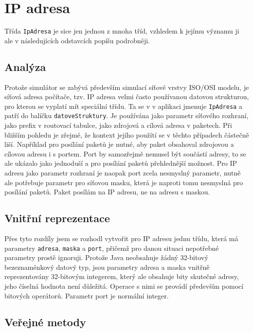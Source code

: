 
\section{IP adresa}

Třída \verb|IpAdresa| je sice jen jednou z mnoha tříd, vzhledem k jejímu významu ji ale v následujících odstavcích popíšu podrobněji.


\subsection{Analýza}

Protože simulátor se zabývá především simulací síťové vrstvy ISO/OSI modelu, je síťová adresa počítače, tzv. IP adresa velmi často používanou datovou strukturou, pro kterou se vyplatí mít speciální třídu. Ta se v v aplikaci jmenuje \verb|IpAdresa| a patří do balíčku \verb|datoveStruktury|. Je používána jako parametr síťového rozhraní, jako prefix v routovací tabulce, jako zdrojová a cílová adresa v paketech. Při bližším pohledu je zřejmé, že kontext jejího použítí se v těchto případech částečně liší. Například pro posílání paketů je nutné, aby paket obsahoval zdrojovou a cílovou adresu i s portem. Port by samozřejmě nemusel být součástí adresy, to se ale ukázalo jako jednoduší a pro posílání paketů přehlednější možnost. Pro IP adresu jako parametr rozhraní je naopak port zcela nesmyslný parametr, nutně ale potřebuje parametr pro síťovou masku, která je naproti tomu nesmyslná pro posílání paketů. Paket posílám na IP adresu, ne na adresu s maskou.


\subsection{Vnitřní reprezentace}

Přes tyto rozdíly jsem se rozhodl vytvořit pro IP adresu jednu třídu, která má parametry \verb|adresa|, \verb|maska| a \verb|port|, přičemž pro danou situaci nepotřebné parametry prostě ignoruji. Protože Java neobsahuje žádný 32-bitový bezeznaménkový datový typ, jsou parametry adresa a maska vnitřně reprezentovány 32-bitovým integerem, který ale obsahuje bity skutečné adresy, jeho číselná hodnota není důležitá. Operace s nimi se provádí především pomocí bitových operátorů. Parametr port je normální integer.


\subsection{Veřejné metody}


